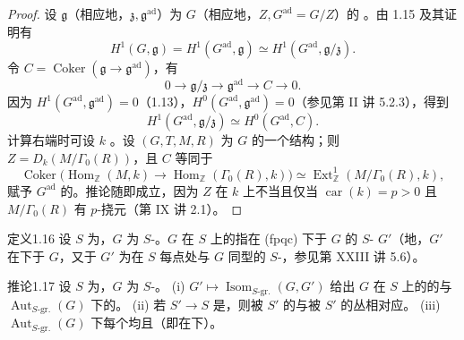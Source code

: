 \begin{proof}
设 $\mathfrak g$（相应地，$\mathfrak z,\mathfrak g^{\mathrm{ad}}$）为 $G$（相应地，$Z,G^{\mathrm{ad}}=G/Z$）的 。由 1.15 及其证明有
\[H^1(G,\mathfrak g)=H^1(G^{\mathrm{ad}},\mathfrak g)\simeq H^1(G^{\mathrm{ad}},\mathfrak g/\mathfrak z).\]
令 $C=\operatorname{Coker}(\mathfrak g\to\mathfrak g^{\mathrm{ad}})$，有
\[0\longrightarrow\mathfrak g/\mathfrak z\longrightarrow\mathfrak g^{\mathrm{ad}}\longrightarrow C\longrightarrow0.\]
因为 $H^1(G^{\mathrm{ad}},\mathfrak g^{\mathrm{ad}})=0$（1.13），$H^0(G^{\mathrm{ad}},\mathfrak g^{\mathrm{ad}})=0$（参见第 II 讲 5.2.3），得到
\[H^1(G^{\mathrm{ad}},\mathfrak g/\mathfrak z)\simeq H^0(G^{\mathrm{ad}},C).\]
计算右端时可设 $k$ 。设 $(G,T,M,R)$ 为 $G$ 的一个结构；则 $Z=D_k(M/\Gamma_0(R))$，且 $C$ 等同于
\[\operatorname{Coker}\bigl(\operatorname{Hom}_{\mathbb Z}(M,k)\longrightarrow\operatorname{Hom}_{\mathbb Z}(\Gamma_0(R),k)\bigr)\simeq\operatorname{Ext}^1_{\mathbb Z}(M/\Gamma_0(R),k),\]
赋予 $G^{\mathrm{ad}}$ 的。推论随即成立，因为 $Z$ 在 $k$ 上不当且仅当 $\operatorname{car}(k)=p>0$ 且 $M/\Gamma_0(R)$ 有 $p$-挠元（第 IX 讲 2.1）。
\end{proof}
\begin{SGAresult}{定义}{1.16}
设 $S$ 为，$G$ 为 $S$-。$G$ 在 $S$ 上的指在 (fpqc) 下于 $G$ 的 $S$- $G'$（地，$G'$ 在下于 $G$，又于 $G'$ 为在 $S$ 每点处与 $G$ 同型的 $S$-，参见第 XXIII 讲 5.6）。
\end{SGAresult}
\begin{SGAresult}{推论}{1.17}
设 $S$ 为，$G$ 为 $S$-。
(i)  $G'\mapsto\operatorname{Isom}_{S\text{-gr.}}(G,G')$ 给出 $G$ 在 $S$ 上的的与 $\operatorname{Aut}_{S\text{-gr.}}(G)$ 下的。
(ii) 若 $S'\to S$ 是，则被 $S'$ 的与被 $S'$ 的丛相对应。
(iii) $\operatorname{Aut}_{S\text{-gr.}}(G)$ 下每个均且（即在下）。
\end{SGAresult}
